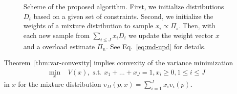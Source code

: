 \begin{figure}
    \centering
    \caption{Scheme of the proposed algorithm. First, we initialize distributions $D_i$ based on a given set of constraints. Second, we initialize the weights of a mixture distribution to sample  $x_i\propto \Pi_i$. Then, with each new sample from $\sum_{i\le J} x_i D_i$ we update the weight vector $x$ and a overload estimate $\Pi_n$. See Eq.~\eqref{eq:md-upd} for details.}
    \label{fig:fscheme}
\end{figure}

Theorem~\ref{thm:var-convexity} implies convexity of the variance minimization %
\begin{align}
    \min_x \; & V(x), \; 
    \text{s.t. } x_1 + \dots + x_J = 1, x_i \ge 0, 1\!\le\! i \!\le\! J\label{eq:var-min}
\end{align}
in $x$ for the mixture distribution $\upsilon_D(p,x) = \sum_{i=1}^J x_i \upsilon_i(p)$. %

